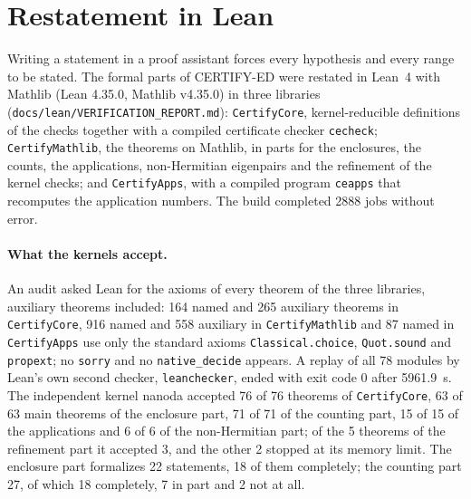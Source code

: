 \documentclass[11pt,a4paper]{article}
\newcommand{\code}[1]{\texttt{#1}}
\begin{document}
\section{Restatement in Lean}
\label{sec:lean}

Writing a statement in a proof assistant forces every hypothesis and every range to be stated. The formal parts of
CERTIFY-ED were restated in Lean~4 \cite{Lean4} with Mathlib \cite{Mathlib2020} (Lean 4.35.0, Mathlib v4.35.0) in three
libraries (\code{docs/lean/VERIFICATION\_REPORT.md}): \code{CertifyCore}, kernel-reducible definitions of the checks
together with a compiled certificate checker \code{cecheck}; \code{CertifyMathlib}, the theorems on Mathlib, in parts
for the enclosures, the counts, the applications, non-Hermitian eigenpairs and the refinement of the kernel checks;
and \code{CertifyApps}, with a compiled program \code{ceapps} that recomputes the application numbers. The build
completed 2888 jobs without error.

\paragraph{What the kernels accept.}
An audit asked Lean for the axioms of every theorem of the three libraries, auxiliary theorems included: 164 named
and 265 auxiliary theorems in \code{CertifyCore}, 916 named and 558 auxiliary in \code{CertifyMathlib} and 87 named in
\code{CertifyApps} use only the standard axioms \code{Classical.choice}, \code{Quot.sound} and \code{propext}; no
\code{sorry} and no \code{native\_decide} appears. A replay of all 78 modules by Lean's own second checker,
\code{leanchecker}, ended with exit code 0 after 5961.9~s. The independent kernel nanoda accepted 76 of 76 theorems of
\code{CertifyCore}, 63 of 63 main theorems of the enclosure part, 71 of 71 of the counting part, 15 of 15 of the
applications and 6 of 6 of the non-Hermitian part; of the 5 theorems of the refinement part it accepted 3, and the
other 2 stopped at its memory limit. The enclosure part formalizes 22 statements, 18 of them completely; the counting
part 27, of which 18 completely, 7 in part and 2 not at all.
\end{document}
